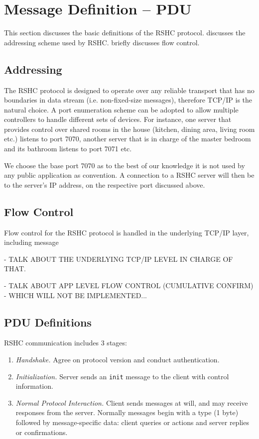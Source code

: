 \section{Message Definition -- PDU}
\label{sec:pdus}

This section discusses the basic definitions of the RSHC protocol.  discusses the addressing scheme used by RSHC.  briefly discusses flow control.

\subsection{Addressing}
\label{sec:pdus:addr}

The RSHC protocol is designed to operate over any reliable transport that has no boundaries in data stream (i.e. non-fixed-size messages), therefore TCP/IP is the natural choice. A port enumeration scheme can be adopted to allow multiple controllers to handle different sets of devices. For instance, one server that provides control over shared rooms in the house (kitchen, dining area, living room etc.) listens to port 7070, another server that is in charge of the master bedroom and its bathroom listens to port 7071 etc.

We choose the base port 7070 as to the best of our knowledge it is not used by any public application as convention. A connection to a RSHC server will then be to the server's IP address, on the respective port discussed above.

\subsection{Flow Control}
\label{sec:pdus:flow}

Flow control for the RSHC protocol is handled in the underlying TCP/IP layer, including message 

- TALK ABOUT THE UNDERLYING TCP/IP LEVEL IN CHARGE OF THAT.

- TALK ABOUT APP LEVEL FLOW CONTROL (CUMULATIVE CONFIRM) - WHICH WILL NOT BE IMPLEMENTED...


\subsection{PDU Definitions}
\label{sec:pdus:pdu}

RSHC communication includes 3 stages:

\begin{enumerate}

\item {\em Handshake.} Agree on protocol version and conduct authentication.

\item {\em Initialization.} Server sends an {\tt init} message to the client with control information.

\item {\em Normal Protocol Interaction.} Client sends messages at will, and may receive responses from the server. Normally messages begin with a type (1 byte) followed by message-specific data: client queries or actions and server replies or confirmations.

\end{enumerate}


